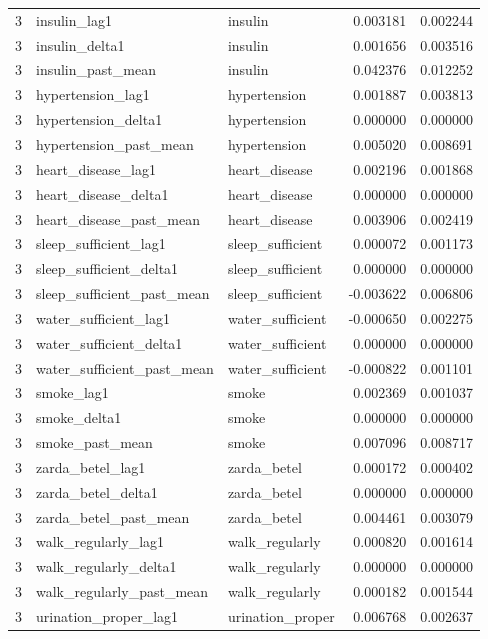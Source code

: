 \begin{longtable}{rllrr}
3 & insulin\_lag1 & insulin & 0.003181 & 0.002244 \\
3 & insulin\_delta1 & insulin & 0.001656 & 0.003516 \\
3 & insulin\_past\_mean & insulin & 0.042376 & 0.012252 \\
3 & hypertension\_lag1 & hypertension & 0.001887 & 0.003813 \\
3 & hypertension\_delta1 & hypertension & 0.000000 & 0.000000 \\
3 & hypertension\_past\_mean & hypertension & 0.005020 & 0.008691 \\
3 & heart\_disease\_lag1 & heart\_disease & 0.002196 & 0.001868 \\
3 & heart\_disease\_delta1 & heart\_disease & 0.000000 & 0.000000 \\
3 & heart\_disease\_past\_mean & heart\_disease & 0.003906 & 0.002419 \\
3 & sleep\_sufficient\_lag1 & sleep\_sufficient & 0.000072 & 0.001173 \\
3 & sleep\_sufficient\_delta1 & sleep\_sufficient & 0.000000 & 0.000000 \\
3 & sleep\_sufficient\_past\_mean & sleep\_sufficient & -0.003622 & 0.006806 \\
3 & water\_sufficient\_lag1 & water\_sufficient & -0.000650 & 0.002275 \\
3 & water\_sufficient\_delta1 & water\_sufficient & 0.000000 & 0.000000 \\
3 & water\_sufficient\_past\_mean & water\_sufficient & -0.000822 & 0.001101 \\
3 & smoke\_lag1 & smoke & 0.002369 & 0.001037 \\
3 & smoke\_delta1 & smoke & 0.000000 & 0.000000 \\
3 & smoke\_past\_mean & smoke & 0.007096 & 0.008717 \\
3 & zarda\_betel\_lag1 & zarda\_betel & 0.000172 & 0.000402 \\
3 & zarda\_betel\_delta1 & zarda\_betel & 0.000000 & 0.000000 \\
3 & zarda\_betel\_past\_mean & zarda\_betel & 0.004461 & 0.003079 \\
3 & walk\_regularly\_lag1 & walk\_regularly & 0.000820 & 0.001614 \\
3 & walk\_regularly\_delta1 & walk\_regularly & 0.000000 & 0.000000 \\
3 & walk\_regularly\_past\_mean & walk\_regularly & 0.000182 & 0.001544 \\
3 & urination\_proper\_lag1 & urination\_proper & 0.006768 & 0.002637 \\

\end{longtable}
